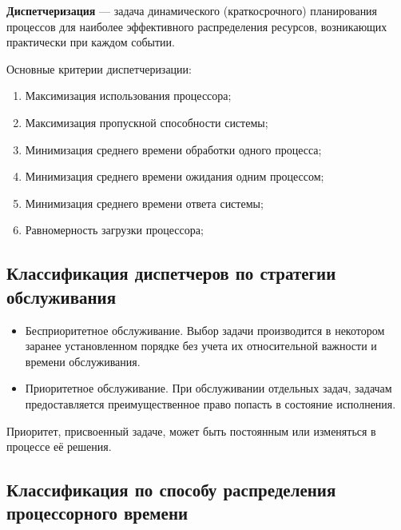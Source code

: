 \textbf{Диспетчеризация} — задача динамического (краткосрочного) планирования процессов для наиболее эффективного распределения ресурсов, возникающих практически при каждом событии.


Основные критерии диспетчеризации:
\begin{enumerate}
    \item Максимизация использования процессора;
    \item Максимизация пропускной способности системы;
    \item Минимизация среднего времени обработки одного процесса;
    \item Минимизация среднего времени ожидания одним процессом;
    \item Минимизация среднего времени ответа системы;
    \item Равномерность загрузки процессора;
\end{enumerate}

\subsection{Классификация диспетчеров по стратегии обслуживания}

\begin{itemize}
    \item Бесприоритетное обслуживание. Выбор задачи производится в некотором заранее установленном порядке без учета их относительной важности и времени обслуживания.
    \item Приоритетное обслуживание. При обслуживании отдельных задач, задачам предоставляется преимущественное право попасть в состояние исполнения.
\end{itemize}

Приоритет, присвоенный задаче, может быть постоянным или изменяться в процессе её решения.

\subsection{Классификация по способу распределения процессорного времени}

